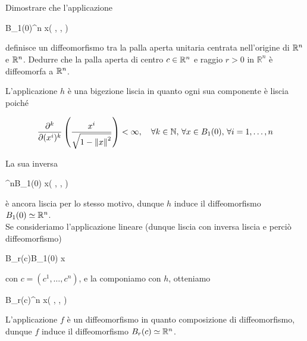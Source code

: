 \tocless\section{}\label{es1-4}

\begin{tcolorbox}
	Dimostrare che l'applicazione
	
		{B_{1}(0)}{\R^{n}}%
		{x}{\left( , \cdots,  \right)}
	
	definisce un diffeomorfismo tra la palla aperta unitaria centrata nell'origine di $ \mathbb{R}^{n} $ e $ \mathbb{R}^{n} $. Dedurre che la palla aperta di centro $ c \in \mathbb{R}^{n} $ e raggio $ r > 0 $ in $ \mathbb{R}^{n} $ è diffeomorfa a $ \mathbb{R}^{n} $.
\end{tcolorbox}

L'applicazione $ h $ è una bigezione liscia in quanto ogni sua componente è liscia poiché

\begin{equation}
	\pdv[k]{(x^{i})} \left( \dfrac{x^{i}}{\sqrt{ 1-\norm{x}^{2} }} \right) < \infty \qcomma \forall k \in \N, \, \forall x \in B_{1}(0), \, \forall i=1,\dots,n
\end{equation}

La sua inversa

%
	{\R^{n}}{B_{1}(0)}%
	{x}{\left( , \cdots,  \right)}
	
è ancora liscia per lo stesso motivo, dunque $ h $ induce il diffeomorfismo $ B_{1}(0) \simeq \mathbb{R}^{n} $.\\
Se consideriamo l'applicazione lineare (dunque liscia con inversa liscia e perciò diffeomorfismo)

%
	{B_{r}(c)}{B_{1}(0)}%
	{x}{}
	
con $ c = (c^{1},\dots,c^{n}) $, e la componiamo con $ h $, otteniamo

%
	{B_{r}(c)}{\R^{n}}%
	{x}{\left( , \cdots,  \right)}

L'applicazione $ f $ è un diffeomorfismo in quanto composizione di diffeomorfismo, dunque $ f $ induce il diffeomorfismo $ B_{r}(c) \simeq \mathbb{R}^{n} $.

\tocless\section{}\label{es1-5}

